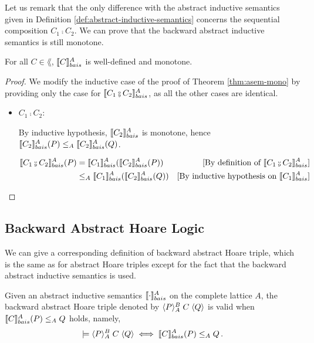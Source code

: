 \documentclass[
  10pt,       %
  twoside,    %
  a4paper,    %
  english,    %
  tikz,       %
  openright,  %
]{book}
\begin{document}
Let us remark that the only difference with the abstract inductive semantics given in
Definition \ref{def:abstract-inductive-semantics} concerns the sequential composition $C_1 \fcmp
C_2$.
We can prove that the backward abstract inductive semantics is still monotone.

\begin{theorem}[Monotonicity]
  \label{thm:asem-mono-back} 
  For all $C \in \lang$, $\llbracket C \rrbracket_{bais}^{A}$ is well-defined and monotone.
\end{theorem}

\begin{proof}
  We modify the inductive case of the proof of Theorem \ref{thm:asem-mono} by
  providing only the case for $\asemback{C_1 \fcmp C_2}$, as all the other cases
  are identical.

  \begin{itemize}
    \item $C_1 \fcmp C_2$:

      By inductive hypothesis, $\llbracket C_2 \rrbracket_{bais}^{A}$ is monotone, hence
      $\llbracket C_2 \rrbracket_{bais}^{A}(P) \leq_A \llbracket C_2 \rrbracket_{bais}^{A}(Q)$.

      \begin{align*}
        \asemback{C_1 \fcmp C_2}(P) 
          &= \asemback{C_1}(\asemback{C_2}(P))
          &\text{[By definition of $\asemback{C_1 \fcmp C_2}$]}\\
          &\leq_A \asemback{C_1}(\asemback{C_2}(Q))
          &\text{[By inductive hypothesis on $\asemback{C_1}$]} 
      \end{align*}
  \end{itemize}
\end{proof}

\subsection{Backward Abstract Hoare Logic}

We can give a corresponding definition of backward abstract Hoare triple,
which is the same as for abstract Hoare triples except for the fact that the backward
abstract inductive semantics is used. 

\begin{definition}
  \label{def:baht}
  Given an abstract inductive semantics $\llbracket \cdot \rrbracket_{bais}^{A}$ on the complete
  lattice $A$, the backward abstract Hoare triple denoted by 
  $\langle P \rangle_{A}^B \; C \; \langle Q \rangle$ is
  valid when $\llbracket C \rrbracket_{bais}^{A}(P) \leq_A Q$ holds, namely, 
%
  $$\models \langle P \rangle_{A}^B \; C \; \langle Q \rangle \iff \llbracket C \rrbracket_{bais}^{A}(P) \leq_A Q\, .$$
\end{definition}
\end{document}
